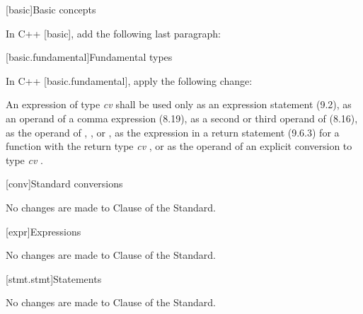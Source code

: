 
[basic]{Basic concepts}

\pnum
In C++ [basic], add the following last paragraph:

\begin{std.txt}
\end{std.txt}


[basic.fundamental]{Fundamental types}

\pnum
In C++ [basic.fundamental], apply the following change:

\begin{std.txt}
An expression of type \emph{cv}  shall be used only as an expression
statement (9.2), as an operand of a comma expression (8.19), as a second or
third operand of  (8.16), as the operand of ,
,  or , as the
expression in a return statement (9.6.3) for a function with the return type
\emph{cv} , or as the operand of an explicit conversion to type
\emph{cv} .
\end{std.txt}

[conv]{Standard conversions}

No changes are made to Clause \the\value{chapter} of the \Cpp Standard.

[expr]{Expressions}

No changes are made to Clause \the\value{chapter} of the \Cpp Standard.

[stmt.stmt]{Statements}

No changes are made to Clause \the\value{chapter} of the \Cpp Standard.
